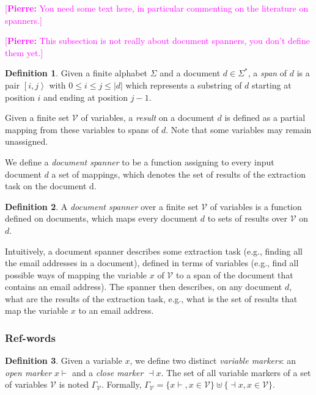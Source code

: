 \documentclass[12px]{article}
\theoremstyle{definition}
\newtheorem{definition}{Definition}
\newcommand{\Span}[1]{\left[ #1 \right\rangle}
\newcommand{\pierre}[1]{\textcolor{magenta}{[\textbf{Pierre:} #1]}}
\begin{document}
        \pierre{You need some text here, in particular commenting on the
        literature on spanners.}

      \pierre{This subsection is not really about document spanners, you
      don't define them yet.}

        \begin{definition}
          Given a finite alphabet $\Sigma$ and a document $d \in \Sigma^*$, a
          \textit{span} of $d$ is a pair $\Span{i, j}$ with $0 \leq i \leq j
          \leq |d|$ which represents a substring of $d$ starting at position
          $i$ and ending at position $j - 1$.
        \end{definition}

        Given a finite set $\mathcal{V}$ of variables, a \textit{result} on a
        document $d$ is defined as a partial mapping from these variables to
        spans of $d$. Note that some variables may remain unassigned.

        We define a \textit{document spanner} to be a function assigning to
        every input document $d$ a set of mappings, which denotes the set of
        results of the extraction task on the document d.

        \begin{definition}
          A \textit{document spanner} over a finite set $\mathcal{V}$ of
          variables is a function defined on documents, which maps every
          document $d$ to sets of results over $\mathcal{V}$ on $d$.
        \end{definition}

        Intuitively, a document spanner describes some extraction task (e.g.,
        finding all the email addresses in a document), defined in terms of
        variables (e.g., find all possible ways of mapping the variable $x$ of
        $\mathcal{V}$ to a span of the document that contains an email
        address).  The spanner then describes, on any document $d$, what are
        the results of the extraction task, e.g., what is the set of results
        that map the variable $x$ to an email address.


      \subsubsection{Ref-words}


        \begin{definition}
          Given a variable $x$, we define two distinct \textit{variable
          markers}: an \textit{open marker} $x{\vdash}$ and a \textit{close
          marker} ${\dashv}x$. The set of all variable markers of a set of
          variables $\mathcal{V}$ is noted $\Gamma_\mathcal{V}$. Formally,
          $\Gamma_\mathcal{V} = \{x{\vdash}, x \in \mathcal{V}\} \uplus
          \{{\dashv}x, x \in \mathcal{V}\}$.
        \end{definition}
\end{document}
